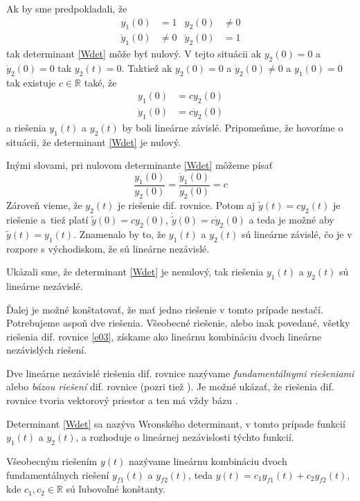\documentclass[a4paper, 10pt, ]{article}
\begin{document}
Ak by sme predpokladali, že 
\begin{subequations} \label{eIC2}
    \begin{align}
        y_1(0) &= 1      &        y_2(0) &\neq 0       \\
        \dot y_1(0) &\neq 0  &      \dot y_2(0) &= 1
    \end{align}
\end{subequations}
tak determinant \eqref{Wdet} môže byť nulový. V tejto situácii ak $y_2(0) = 0$ a $\dot y_2(0) = 0$ tak $y_2(t) = 0$. Taktiež ak $y_2(0) = 0$ a $\dot y_2(0) \neq 0$ a $y_1(0) = 0$ tak existuje $c \in \mathbb R$ také, že
\begin{align}
    y_1(0) &= c y_2(0) \\
    \dot y_1(0) &= c \dot y_2(0)
\end{align}
a riešenia $y_1(t)$ a $y_2(t)$ by boli lineárne závislé. Pripomeňme, že hovoríme o situácii, že determinant \eqref{Wdet} je nulový. 

Inými slovami, pri nulovom determinante \eqref{Wdet} môžeme písať
\begin{equation}
    \frac{y_1(0)}{y_2(0)} = \frac{\dot y_1(0)}{\dot y_2(0)} = c
\end{equation}
Zároveň vieme, že $y_2(t)$ je riešenie dif. rovnice. Potom aj $\tilde y(t) = c y_2(t)$ je riešenie a~tiež platí $\tilde y(0) = c y_2(0)$, $\dot{\tilde{y}}(0) = c \dot y_2(0)$ a teda je možné aby $\tilde y(t) = y_1(t)$. Znamenalo by to, že $y_1(t)$ a $y_2(t)$ sú lineárne závislé, čo je v rozpore s východiskom, že sú lineárne nezávislé.

Ukázali sme, že determinant \eqref{Wdet} je nenulový, tak riešenia $y_1(t)$ a $y_2(t)$ sú lineárne nezávislé.


Ďalej je možné konštatovať, že mať jedno riešenie v tomto prípade nestačí. Potrebujeme aspoň dve riešenia. Všeobecné riešenie, alebo inak povedané, všetky riešenia dif. rovnice \eqref{e03}, získame ako lineárnu kombináciu dvoch lineárne nezávislých riešení.

Dve lineárne nezávislé riešenia dif. rovnice nazývame \emph{fundamentálnymi riešeniami} alebo \emph{bázou riešení} dif. rovnice (pozri tiež \cite{Kuben1995}). Je možné ukázať, že riešenia dif. rovnice tvoria vektorový priestor a ten má vždy bázu \cite{Kuben1995}.

Determinant \eqref{Wdet} sa nazýva Wronského determinant, v tomto prípade funkcií $y_1(t)$ a $y_2(t)$, a rozhoduje o lineárnej nezávislosti týchto funkcií.

Všeobecným riešením $y(t)$ nazývame lineárnu kombináciu dvoch fundamentálnych riešení $y_{f1}(t)$ a $y_{f2}(t)$, teda $y(t) = c_1 y_{f1}(t) + c_2 y_{f2}(t)$, kde $c_1, c_2 \in \mathbb R$ sú ľubovoľné konštanty.
\end{document}
